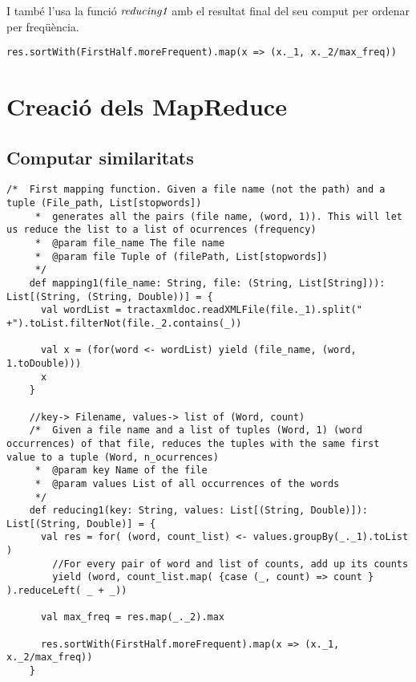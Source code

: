 \documentclass{report}
\begin{document}
I també l'usa la funció $ \emph{reducing1} $ amb el resultat final del seu comput per ordenar per freqüència.

\begin{lstlisting}[style=scalaHighlight]
    res.sortWith(FirstHalf.moreFrequent).map(x => (x._1, x._2/max_freq))
\end{lstlisting}

\chapter{Creació dels MapReduce}

\section{Computar similaritats}

\begin{lstlisting}[style=scalaHighlight]
    /*  First mapping function. Given a file name (not the path) and a tuple (File_path, List[stopwords]) 
     *  generates all the pairs (file name, (word, 1)). This will let us reduce the list to a list of ocurrences (frequency)
     *  @param file_name The file name
     *  @param file Tuple of (filePath, List[stopwords])
     */
    def mapping1(file_name: String, file: (String, List[String])): List[(String, (String, Double))] = {
      val wordList = tractaxmldoc.readXMLFile(file._1).split(" +").toList.filterNot(file._2.contains(_))
      
      val x = (for(word <- wordList) yield (file_name, (word, 1.toDouble)))
      x
    }
    
    //key-> Filename, values-> list of (Word, count)
    /*  Given a file name and a list of tuples (Word, 1) (word occurrences) of that file, reduces the tuples with the same first value to a tuple (Word, n_ocurrences)
     *  @param key Name of the file
     *  @param values List of all occurrences of the words
     */
    def reducing1(key: String, values: List[(String, Double)]): List[(String, Double)] = {
      val res = for( (word, count_list) <- values.groupBy(_._1).toList ) 
        //For every pair of word and list of counts, add up its counts
        yield (word, count_list.map( {case (_, count) => count } ).reduceLeft( _ + _))
      
      val max_freq = res.map(_._2).max
      
      res.sortWith(FirstHalf.moreFrequent).map(x => (x._1, x._2/max_freq))
    }
    
\end{lstlisting}
\end{document}
